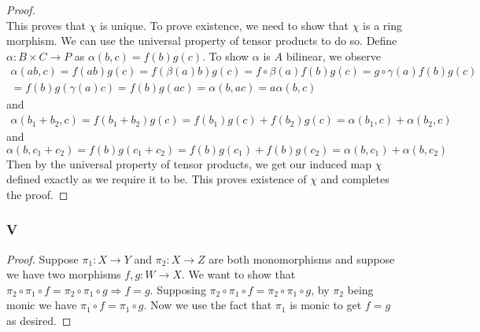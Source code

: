 \documentclass{article}
\begin{document}
\begin{proof}
\[    \]
    This proves that $\chi$ is unique. To prove existence, we need to show that $\chi$ is a ring morphism. We can use the universal property of tensor products to do so. Define $\alpha:B\times C\to P$ as $\alpha(b,c)=f(b)g(c)$. To show $\alpha$ is $A$ bilinear, we observe
    \begin{align*}
        \alpha(ab,c)=f(ab)g(c)=f(\beta(a)b)g(c)=f\circ \beta(a)f(b)g(c)=g\circ \gamma(a)f(b)g(c)\\
        =f(b)g(\gamma(a)c)=f(b)g(ac)=\alpha(b,ac)=a\alpha(b,c)
    \end{align*}
    and
    \begin{align*}
    \alpha(b_1+b_2,c)=f(b_1+b_2)g(c)=f(b_1)g(c)+f(b_2)g(c)=\alpha(b_1,c)+\alpha(b_2,c)
    \end{align*}
    and
    \[
    \alpha(b,c_1+c_2)=f(b)g(c_1+c_2)=f(b)g(c_1)+f(b)g(c_2)=\alpha(b,c_1)+\alpha(b,c_2)
    \]
    Then by the universal property of tensor products, we get our induced map $\chi$ defined exactly as we require it to be. This proves existence of $\chi$ and completes the proof.
\end{proof}
\subsubsection{V}\label{1.3.V}
\begin{proof}
    Suppose $\pi_1:X\to Y$ and $\pi_2:X\to Z$ are both monomorphisms and suppose we have two morphisms $f,g:W\to X$. We want to show that $\pi_2\circ \pi_1\circ f=\pi_2\circ \pi_1\circ g\Rightarrow f=g$. Supposing $\pi_2\circ \pi_1\circ f=\pi_2\circ \pi_1\circ g$, by $\pi_2$ being monic we have $\pi_1\circ f=\pi_1\circ g$. Now we use the fact that $\pi_1$ is monic to get $f=g$ as desired.
\end{proof}
\end{document}
